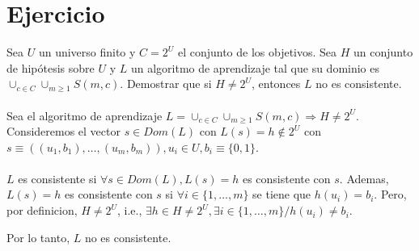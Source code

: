 \documentclass{article}
\begin{document}
\section{Ejercicio}
Sea \(U\) un universo finito y \(C = 2^U\) el conjunto de los objetivos. Sea \(H\) un conjunto de hipótesis sobre \(U\) y \(L\) un algoritmo de aprendizaje tal que su dominio es \( \cup_{c\in C}\cup_{m\geq1}S(m,c)\). Demostrar que si \(H \neq 2^U\), entonces \(L\) no es consistente.\\\\
Sea el algoritmo de aprendizaje \(L=\cup_{c\in C}\cup_{m\geq1}S(m,c)\Rightarrow H \neq 2^U\). Consideremos el vector \(s\in Dom(L)\) con \(L(s)=h \notin 2^U\) con \(s \equiv ((u_1,b_1), \ldots, (u_m,b_m)), u_i \in U, b_i \equiv \{0,1\}\).\\\\
\(L\) es consistente si \(\forall s\in Dom(L), L(s)=h\) es consistente con \(s\). Ademas, \(L(s)=h\) es consistente con \(s\) si \(\forall i \in \{1,\ldots,m\}\) se tiene que \(h(u_i)=b_i\). Pero, por definicion, \(H \neq 2^U\), i.e., \(\exists h \in H\neq 2^U, \exists i \in \{1,\ldots,m\}/h(u_i)\neq b_i\).
 \begin{center}
 Por lo tanto, \(L\) no es consistente.  
 \end{center}
\end{document}
